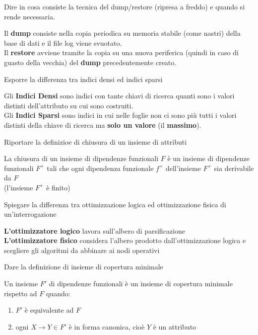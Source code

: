 \documentclass{exam}
\begin{document}
\begin{questions}
    \question Dire in cosa consiste la tecnica del dump/restore (ripresa a freddo) e quando si rende necessaria.
    \begin{solution}
        Il \textbf{dump} consiste nella copia periodica su memoria stabile (come nastri) della base di dati e il file log viene svuotato.
        \\
        Il \textbf{restore} avviene tramite la copia su una nuova periferica (quindi in caso di guasto della vecchia)
        del \textbf{dump} precedentemente creato.
    \end{solution}
    \question Esporre la differenza tra indici densi ed indici sparsi
    \begin{solution}
        Gli \textbf{Indici Densi} sono indici con tante chiavi di ricerca quanti sono i valori distinti dell'attributo su cui sono costruiti.\\
        Gli \textbf{Indici Sparsi} sono indici in cui nelle foglie non ci sono più tutti i valori distinti della chiave di ricerca ma \textbf{solo un valore} (il \textbf{massimo}).
    \end{solution}
    \question Riportare la definizioe di chiusura di un insieme di attributi
    \begin{solution}
        La chiusura di un insieme di dipendenze funzionali $F$ è un insieme di dipendenze funzionali $F^+$ tali che ogni dipendenza funzionale $f^+$ dell'insieme $F^+$ sia derivabile da $F$ 
        \\(l'insieme $F^+$ è finito)
    \end{solution}
    \question Spiegare la differenza tra ottimizzazione logica ed ottimizzazione fisica di un'interrogazione
    \begin{solution}
        \textbf{L'ottimizzatore logico} lavora sull'albero di parsificazione\\
        \textbf{L'ottimizzatore fisico} considera l'albero prodotto dall'ottimizzazione logica e scegliere gli algoritmi da abbinare ai nodi operativi
    \end{solution}
    \question Dare la definizione di insieme di copertura minimale
    \begin{solution}
        Un insieme $F'$ di dipendenze funzionali è un insieme di  copertura minimale rispetto ad $F$ quando:
        \begin{enumerate}
            \item $F'$ è equivalente ad $F$
            \item ogni $X \rightarrow Y \in F'$ è in forma canonica, cioè $Y$ è un attributo

\end{enumerate}
\end{solution}
\end{questions}
\end{document}
